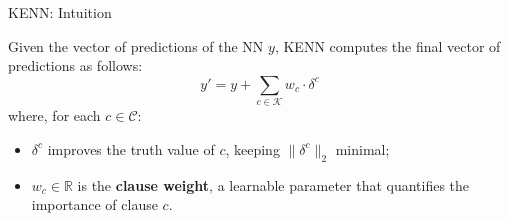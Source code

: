 \documentclass{beamer}
\begin{document}

%		



\begin{frame}{KENN: Intuition}

Given the vector of predictions of the NN $y$, KENN computes the final vector of predictions as follows: $$y' = y +\sum_{c\in \mathcal{K}} w_c \cdot \delta^c$$
		where, for each $c \in \mathcal{C}$:
		\begin{itemize}
			\item $\delta^c$ improves the truth value of $c$, keeping $\|\delta^c\|_2$ minimal;
				\item $w_c \in \mathbb{R}$ is the \textbf{clause weight}, a learnable parameter that quantifies the importance of clause $c$.
		\end{itemize}

	
	
\end{frame}
\end{document}

